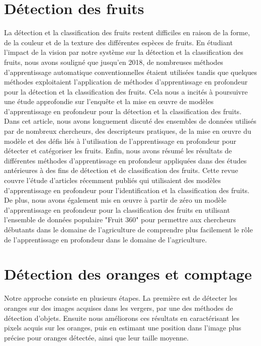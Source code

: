 \section{Détection des fruits}
La détection et la classification des fruits restent difficiles en raison de la forme, de la couleur et de la texture des différentes espèces de fruits. En étudiant l'impact de la vision par notre système sur la détection et la classification des fruits, nous avons souligné que jusqu'en 2018, de nombreuses méthodes d'apprentissage automatique conventionnelles étaient utilisées tandis que quelques méthodes exploitaient l'application de méthodes d'apprentissage en profondeur pour la détection et la classification des fruits. Cela nous a incités à poursuivre une étude approfondie sur l'enquête et la mise en œuvre de modèles d'apprentissage en profondeur pour la détection et la classification des fruits. Dans cet article, nous avons longuement discuté des ensembles de données utilisés par de nombreux chercheurs, des descripteurs pratiques, de la mise en œuvre du modèle et des défis liés à l'utilisation de l'apprentissage en profondeur pour détecter et catégoriser les fruits. Enfin, nous avons résumé les résultats de différentes méthodes d'apprentissage en profondeur appliquées dans des études antérieures à des fins de détection et de classification des fruits. Cette revue couvre l'étude d'articles récemment publiés qui utilisaient des modèles d'apprentissage en profondeur pour l'identification et la classification des fruits. De plus, nous avons également mis en œuvre à partir de zéro un modèle d'apprentissage en profondeur pour la classification des fruits en utilisant l'ensemble de données populaire "Fruit 360" pour permettre aux chercheurs débutants dans le domaine de l'agriculture de comprendre plus facilement le rôle de l'apprentissage en profondeur dans le domaine de l'agriculture.


\section{Détection des oranges et comptage}

Notre approche consiste en plusieurs étapes. La première est de détecter les oranges sur des images acquises dans les vergers, par une des méthodes de détection d’objets. Ensuite nous améliorons ces résultats en caractérisant les pixels acquis sur les oranges, puis en estimant une position  dans l’image plus précise pour oranges détectée, ainsi que leur taille moyenne.

